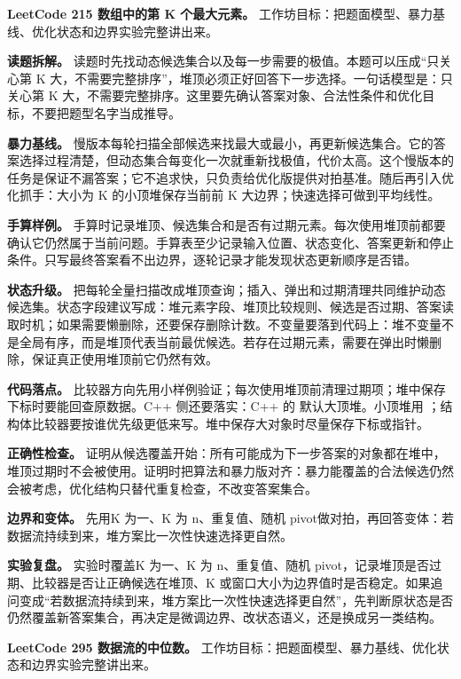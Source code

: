 \noindent\textbf{LeetCode 215 数组中的第 K 个最大元素。} 工作坊目标：把题面模型、暴力基线、优化状态和边界实验完整讲出来。

\textbf{读题拆解。} 读题时先找动态候选集合以及每一步需要的极值。本题可以压成“只关心第 K 大，不需要完整排序”，堆顶必须正好回答下一步选择。一句话模型是：只关心第 K 大，不需要完整排序。这里要先确认答案对象、合法性条件和优化目标，不要把题型名字当成推导。

\textbf{暴力基线。} 慢版本每轮扫描全部候选来找最大或最小，再更新候选集合。它的答案选择过程清楚，但动态集合每变化一次就重新找极值，代价太高。这个慢版本的任务是保证不漏答案；它不追求快，只负责给优化版提供对拍基准。随后再引入优化抓手：大小为 K 的小顶堆保存当前前 K 大边界；快速选择可做到平均线性。

\textbf{手算样例。} 手算时记录堆顶、候选集合和是否有过期元素。每次使用堆顶前都要确认它仍然属于当前问题。手算表至少记录输入位置、状态变化、答案更新和停止条件。只写最终答案看不出边界，逐轮记录才能发现状态更新顺序是否错。

\textbf{状态升级。} 把每轮全量扫描改成堆顶查询；插入、弹出和过期清理共同维护动态候选集。状态字段建议写成：堆元素字段、堆顶比较规则、候选是否过期、答案读取时机；如果需要懒删除，还要保存删除计数。不变量要落到代码上：堆不变量不是全局有序，而是堆顶代表当前最优候选。若存在过期元素，需要在弹出时懒删除，保证真正使用堆顶前它仍然有效。

\textbf{代码落点。} 比较器方向先用小样例验证；每次使用堆顶前清理过期项；堆中保存下标时要能回查原数据。C++ 侧还要落实：C++ 的  默认大顶堆。小顶堆用 ；结构体比较器要按谁优先级更低来写。堆中保存大对象时尽量保存下标或指针。

\textbf{正确性检查。} 证明从候选覆盖开始：所有可能成为下一步答案的对象都在堆中，堆顶过期时不会被使用。证明时把算法和暴力版对齐：暴力能覆盖的合法候选仍然会被考虑，优化结构只替代重复检查，不改变答案集合。

\textbf{边界和变体。} 先用K 为一、K 为 n、重复值、随机 pivot做对拍，再回答变体：若数据流持续到来，堆方案比一次性快速选择更自然。

\textbf{实验复盘。} 实验时覆盖K 为一、K 为 n、重复值、随机 pivot，记录堆顶是否过期、比较器是否让正确候选在堆顶、K 或窗口大小为边界值时是否稳定。如果追问变成“若数据流持续到来，堆方案比一次性快速选择更自然”，先判断原状态是否仍然覆盖新答案集合，再决定是微调边界、改状态语义，还是换成另一类结构。

\noindent\textbf{LeetCode 295 数据流的中位数。} 工作坊目标：把题面模型、暴力基线、优化状态和边界实验完整讲出来。


